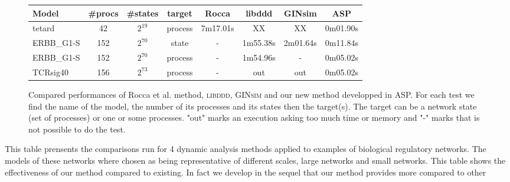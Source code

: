 \begin{center}

\begin{figure}
\label{tab:reachability}
\noindent
\begin{tabular}{|l||c|c|c||c|c|c|c|}
  \hline
   Model& \#procs & \#states & target & Rocca & libddd & GINsim & ASP \\
  \hline
  tetard \cite{khalis2009smbionet} & 42 & $2^{19}$ & process & 7m17.01s & XX & XX & 0m01.90s \\
  \hline
  ERBB\_G1-S \cite{Samaga2009}  & 152 & $2^{70}$ & state & - &1m55.38s & 2m01.64s & 0m11.84s \\
  \hline
  ERBB\_G1-S & 152 & $2^{70}$ & process & - &1m54.96s & - & 0m05.02s \\
  \hline
  TCRsig40 \cite{Klamt06} & 156 & $2^{73}$ & process & - & out & out & 0m05.02s \\
  \hline
\end{tabular}
\caption{Compared performances of Rocca et al. method, \textsc{libddd}, \textsc{GINsim} and our new method developped in ASP. For each test we find the name of the model, the number of its processes and its states then the target(s). The target can be a network state (set of processes) or one or some processes. "out" marks an execution asking too much time or memory and "-" marks that is not possible to do the test.
}
\end{figure}
\end{center}
This table prensents the comparisons run for 4 dynamic analysis methods applied to examples of biological regulatory networks. The models of these networks where chosen as being representative of different scales, large networks and small networks.
This table shows the effectiveness of our method compared to existing. In fact we develop in the sequel that our method provides more compared to other

